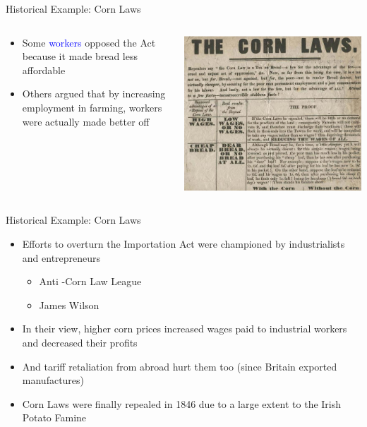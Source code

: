 \documentclass[10pt,hyperref={CJKbookmarks=true},xcolor=dvipsnames,aspectratio=169]{beamer}
\begin{document}
\begin{frame}{Historical Example: Corn Laws }


\begin{columns}[onlytextwidth]
\begin{column}{0.3\textwidth}
\begin{itemize}
\item Some \textcolor{blue}{workers} opposed the Act because it made bread
less affordable 
\item Others argued that by increasing employment in farming, workers were
actually made better off 
\end{itemize}

\end{column}
\begin{column}{0.7\textwidth}
\centering \includegraphics[scale=0.5]{fig/sfm/lec4-1}
\end{column}
\end{columns}

\end{frame}

\begin{frame}{Historical Example: Corn Laws }

\begin{itemize}
\item Efforts to overturn the Importation Act were championed by industrialists
and entrepreneurs 

\begin{itemize}
\item Anti -Corn Law League 
\item James Wilson 
\end{itemize}
\item In their view, higher corn prices increased wages paid to industrial
workers and decreased their profits 
\item And tariff retaliation from abroad hurt them too (since Britain exported
manufactures) 
\item Corn Laws were finally repealed in 1846 due to a large extent to the
Irish Potato Famine
\end{itemize}
\end{frame}
\end{document}
